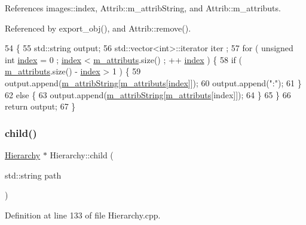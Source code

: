 References images\+::index, Attrib\+::m\+\_\+attrib\+String, and Attrib\+::m\+\_\+attributs.



Referenced by export\+\_\+obj(), and Attrib\+::remove().


\begin{DoxyCode}
54                             \{
55   std::string output;
56   std::vector<int>::iterator iter ;
57   \textcolor{keywordflow}{for} ( \textcolor{keywordtype}{unsigned} \textcolor{keywordtype}{int} \hyperlink{namespaceimages_a54407fd574970b3178647ae096321a57}{index} = 0 ; \hyperlink{namespaceimages_a54407fd574970b3178647ae096321a57}{index} < \hyperlink{classAttrib_ac4bd58a0cc6b38a3b711d609a3d3aacc}{m\_attributs}.size() ; ++
      \hyperlink{namespaceimages_a54407fd574970b3178647ae096321a57}{index} ) \{
58     \textcolor{keywordflow}{if} ( \hyperlink{classAttrib_ac4bd58a0cc6b38a3b711d609a3d3aacc}{m\_attributs}.size() - \hyperlink{namespaceimages_a54407fd574970b3178647ae096321a57}{index} > 1 ) \{
59       output.append(\hyperlink{classAttrib_a3414521d7a82476e874b25a5407b5e63}{m\_attribString}[\hyperlink{classAttrib_ac4bd58a0cc6b38a3b711d609a3d3aacc}{m\_attributs}[\hyperlink{namespaceimages_a54407fd574970b3178647ae096321a57}{index}]]);
60       output.append(\textcolor{stringliteral}{":"});
61     \}
62     \textcolor{keywordflow}{else} \{
63       output.append(\hyperlink{classAttrib_a3414521d7a82476e874b25a5407b5e63}{m\_attribString}[\hyperlink{classAttrib_ac4bd58a0cc6b38a3b711d609a3d3aacc}{m\_attributs}[index]]);
64     \}
65   \}
66   \textcolor{keywordflow}{return} output;
67 \}
\end{DoxyCode}
\mbox{\label{classHierarchy_a1e207f973c694b538bf90107b4868817}} 
\subsubsection{\texorpdfstring{child()}{child()}}
{\footnotesize\ttfamily \hyperlink{classHierarchy}{Hierarchy} $\ast$ Hierarchy\+::child (\begin{DoxyParamCaption}\item[{std\+::string}]{path }\end{DoxyParamCaption})\hspace{0.3cm}{\ttfamily [inherited]}}



Definition at line 133 of file Hierarchy.\+cpp.




